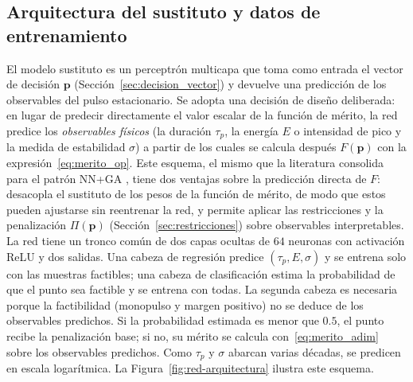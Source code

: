 \subsection{Arquitectura del sustituto y datos de entrenamiento}
\label{sec:nnga_arquitectura}

El modelo sustituto es un perceptrón multicapa que toma como entrada el vector de
decisión $\mathbf{p}$ (Sección~\ref{sec:decision_vector}) y devuelve una predicción
de los observables del pulso estacionario. Se adopta una decisión de diseño
deliberada: en lugar de predecir directamente el valor escalar de la función de
mérito, la red predice los \emph{observables físicos} (la duración $\tau_p$, la
energía $E$ o intensidad de pico y la medida de estabilidad $\sigma$) a partir de los
cuales se calcula después $F(\mathbf{p})$ con la expresión~\eqref{eq:merito_op}. Este
esquema, el mismo que la literatura consolida para el patrón NN+GA
\cite{Han2024}, tiene dos ventajas sobre la predicción directa de $F$: desacopla el
sustituto de los pesos de la función de mérito, de modo que estos pueden ajustarse
sin reentrenar la red, y permite aplicar las restricciones y la penalización
$\Pi(\mathbf{p})$ (Sección~\ref{sec:restricciones}) sobre observables interpretables.
La red tiene un tronco común de dos capas ocultas de $64$ neuronas con activación ReLU
y dos salidas. Una cabeza de regresión predice $(\tau_p, E, \sigma)$ y se entrena solo
con las muestras factibles; una cabeza de clasificación estima la probabilidad de que el
punto sea factible y se entrena con todas. La segunda cabeza es necesaria porque la
factibilidad (monopulso y margen positivo) no se deduce de los observables predichos.
Si la probabilidad estimada es menor que $0.5$, el punto recibe la penalización base;
si no, su mérito se calcula con~\eqref{eq:merito_adim} sobre los observables predichos.
Como $\tau_p$ y $\sigma$ abarcan varias décadas, se predicen en escala logarítmica.
La Figura~\ref{fig:red-arquitectura} ilustra este esquema.

